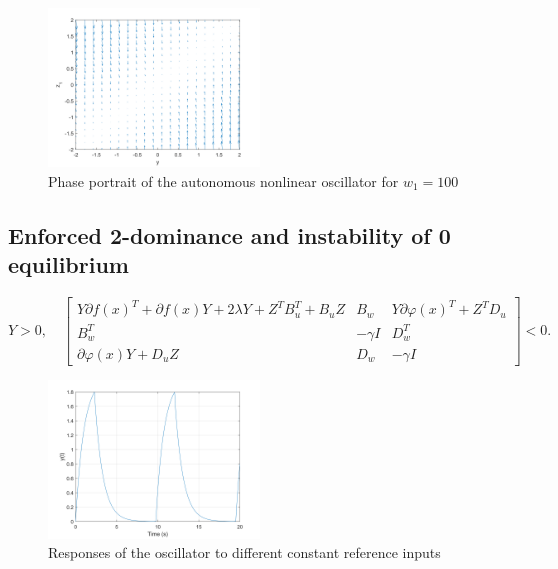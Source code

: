 \documentclass{article}
\begin{document}
\begin{figure}[H]
    \centering
    \includegraphics[width=0.5\textwidth]{figures/oscillator_phase_portrait.png}
    \caption{Phase portrait of the autonomous nonlinear oscillator for $w_1 = 100$}
    \label{fig:phase_portrait_w100}
\end{figure}

\subsection{Enforced 2-dominance and instability of 0 equilibrium}

\begin{equation}
    Y > 0, \quad
    \left[
    \begin{array}{ccc}
    Y \partial f(x)^T + \partial f(x) Y + 2\lambda Y + Z^T B_u^T + B_u Z & B_w & Y \partial \varphi(x)^T + Z^T D_u \\
    B_w^T & -\gamma I & D_w^T \\
    \partial \varphi(x) Y + D_u Z & D_w & -\gamma I
    \end{array}
    \right] < 0.
\end{equation}

\begin{figure}[H]
    \centering
    \includegraphics[width=0.5\textwidth]{figures/13_oscillator_responses.png}
    \caption{Responses of the oscillator to different constant reference inputs}
    \label{fig:13_responses}
\end{figure}
\end{document}
